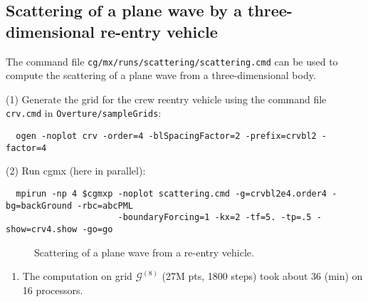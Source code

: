 \documentclass{article}
\newcommand{\Gc}{{\mathcal G}}
\begin{document}
\subsection{Scattering of a plane wave by a three-dimensional re-entry vehicle} \label{sec:scatCRV}

The command file {\tt cg/mx/runs/scattering/scattering.cmd} can be used to compute the scattering
of a plane wave from a three-dimensional body.

\noindent (1) Generate the grid for the crew reentry vehicle using the command file {\tt crv.cmd} in {\tt Overture/sampleGrids}:
{\small
\begin{verbatim}
  ogen -noplot crv -order=4 -blSpacingFactor=2 -prefix=crvbl2 -factor=4
\end{verbatim}
}
\noindent (2) Run cgmx (here in parallel): 
\begin{verbatim}
  mpirun -np 4 $cgmxp -noplot scattering.cmd -g=crvbl2e4.order4 -bg=backGround -rbc=abcPML 
                      -boundaryForcing=1 -kx=2 -tf=5. -tp=.5 -show=crv4.show -go=go 
\end{verbatim}

{
\begin{figure}[hbt]
\newcommand{\figWidth}{7.5cm}
\newcommand{\trimfig}[2]{\trimFig{#1}{#2}{0.1}{0.05}{.05}{.05}}
\begin{center}
\end{center}
\caption{Scattering of a plane wave from a re-entry vehicle.}
\label{fig:scatCRV}
\end{figure}
\begin{enumerate}
  \item The computation on grid $\Gc^{(8)}$ (27M pts, 1800 steps) took about $36$ (min) on 16 processors. 
\end{enumerate}

}
\end{document}
